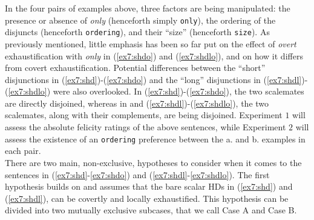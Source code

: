 In the four pairs of examples above, three factors are being manipulated: the presence or absence of \textit{only} (henceforth simply \texttt{only}), the ordering of the disjuncts (henceforth \texttt{ordering}), and their ``size'' (henceforth \texttt{size}). As previously mentioned, little emphasis has been so far put on the effect of \textit{overt} exhaustification with \textit{only} in (\ref{ex7:shdo}) and (\ref{ex7:shdlo}), and on how it differs from covert exhaustification. Potential differences between the ``short'' disjunctions in (\ref{ex7:shd})-(\ref{ex7:shdo}) and the ``long'' disjunctions in (\ref{ex7:shdl})-(\ref{ex7:shdlo}) were also overlooked. In (\ref{ex7:shd})-(\ref{ex7:shdo}), the two scalemates are directly disjoined, whereas in and (\ref{ex7:shdl})-(\ref{ex7:shdlo}), the two scalemates, along with their complements, are being disjoined. Experiment $1$ will assess the absolute felicity ratings of the above sentences, while Experiment $2$ will assess the existence of an \texttt{ordering} preference between the a. and b. examples in each pair.\\

There are two main, non-exclusive, hypotheses to consider when it comes to the sentences in (\ref{ex7:shd}-\ref{ex7:shdo}) and (\ref{ex7:shdl}-\ref{ex7:shdlo}). The first hypothesis builds on \citet{Fox2007,Chierchia2009,Spector2008} and assumes that the bare scalar HDs in (\ref{ex7:shd}) and (\ref{ex7:shdl}), can be covertly and locally exhaustified. This hypothesis can be divided into two mutually exclusive subcases, that we call Case A and Case B.

